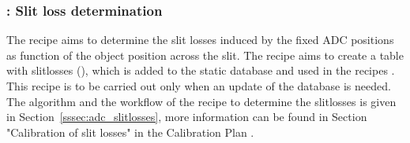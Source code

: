 \subsubsection{: Slit loss determination}
The recipe \hyperref[sssec:adc_slitlosses]{} aims to determine the slit losses induced by the fixed \ac{ADC} positions as function of the object position across the slit. The recipe aims to create a table with slitlosses (\hyperref[dataitem:lm_adc_slitloss]{}), which is added to the static database and used in the recipes \hyperref[rec:metis_lm_lss_std]{}. This recipe is to be carried out only when an update of the database is needed. The algorithm and the workflow of the recipe to determine the slitlosses is given in Section~\ref{sssec:adc_slitlosses}, more information can be found in Section "Calibration of slit losses" in the Calibration Plan \cite{METIS-calibration_plan}. 


